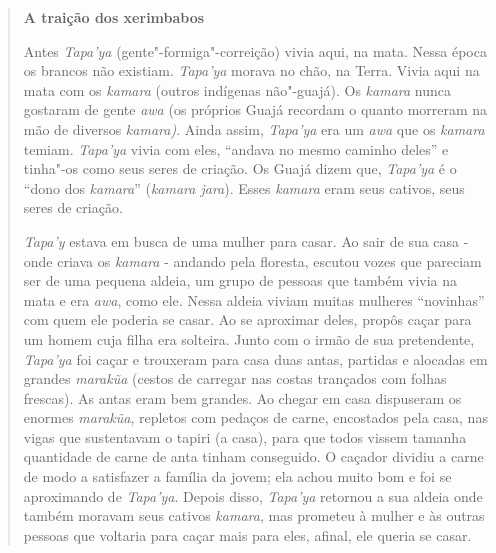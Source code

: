 \begin{quote}
\textbf{A traição dos xerimbabos}

Antes \emph{Tapa'ya} (gente"-formiga"-correição) vivia aqui, na mata.
Nessa época os brancos não existiam. \emph{Tapa'ya} morava no chão, na
Terra. Vivia aqui na mata com os \emph{kamara} (outros indígenas
não"-guajá). Os \emph{kamara} nunca gostaram de gente \emph{awa} (os
próprios Guajá recordam o quanto morreram na mão de diversos
\emph{kamara)}. Ainda assim, \emph{Tapa'ya} era um \emph{awa} que os
\emph{kamara} temiam. \emph{Tapa'ya} vivia com eles, ``andava no mesmo
caminho deles'' e tinha"-os como seus seres de criação. Os Guajá dizem
que, \emph{Tapa'ya} é o ``dono dos \emph{kamara}'' (\emph{kamara jara}).
Esses \emph{kamara} eram seus cativos, seus seres de criação.

\emph{Tapa'y} estava em busca de uma mulher para casar. Ao sair de sua
casa - onde criava os \emph{kamara} - andando pela floresta, escutou
vozes que pareciam ser de uma pequena aldeia, um grupo de pessoas que
também vivia na mata e era \emph{awa}, como ele. Nessa aldeia viviam
muitas mulheres ``novinhas'' com quem ele poderia se casar. Ao se
aproximar deles, propôs caçar para um homem cuja filha era solteira.
Junto com o irmão de sua pretendente, \emph{Tapa'ya} foi caçar e
trouxeram para casa duas antas, partidas e alocadas em grandes
\emph{marakũa} (cestos de carregar nas costas trançados com folhas
frescas). As antas eram bem grandes. Ao chegar em casa dispuseram os
enormes \emph{marakũa}, repletos com pedaços de carne, encostados pela
casa, nas vigas que sustentavam o tapiri (a casa), para que todos vissem
tamanha quantidade de carne de anta tinham conseguido. O caçador dividiu
a carne de modo a satisfazer a família da jovem; ela achou muito bom e
foi se aproximando de \emph{Tapa'ya}. Depois disso, \emph{Tapa'ya}
retornou a sua aldeia onde também moravam seus cativos \emph{kamara},
mas prometeu à mulher e às outras pessoas que voltaria para caçar mais
para eles, afinal, ele queria se casar.


\end{quote}
